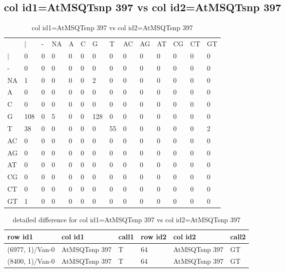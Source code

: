 \subsection{col id1=AtMSQTsnp 397 vs col id2=AtMSQTsnp 397}
\begin{center}
\begin{longtable}{|l|l|l|l|l|l|l|l|l|l|l|l|l|l|}
\caption{col id1=AtMSQTsnp 397 vs col id2=AtMSQTsnp 397} \label{table_dm904}\\
\hline
\\
\hline
&$|$&-&NA&A&C&G&T&AC&AG&AT&CG&CT&GT\\
$|$&0&0&0&0&0&0&0&0&0&0&0&0&0\\
-&0&0&0&0&0&0&0&0&0&0&0&0&0\\
NA&1&0&0&0&0&2&0&0&0&0&0&0&0\\
A&0&0&0&0&0&0&0&0&0&0&0&0&0\\
C&0&0&0&0&0&0&0&0&0&0&0&0&0\\
G&108&0&5&0&0&128&0&0&0&0&0&0&0\\
T&38&0&0&0&0&0&55&0&0&0&0&0&2\\
AC&0&0&0&0&0&0&0&0&0&0&0&0&0\\
AG&0&0&0&0&0&0&0&0&0&0&0&0&0\\
AT&0&0&0&0&0&0&0&0&0&0&0&0&0\\
CG&0&0&0&0&0&0&0&0&0&0&0&0&0\\
CT&0&0&0&0&0&0&0&0&0&0&0&0&0\\
GT&1&0&0&0&0&0&0&0&0&0&0&0&0\\
\hline
\end{longtable}
\end{center}

\begin{center}
\begin{longtable}{|l|l|l|l|l|l|}
\caption{detailed difference for col id1=AtMSQTsnp 397 vs col id2=AtMSQTsnp 397} \label{table_dm905}\\
\hline
row id1&col id1&call1&row id2&col id2&call2\\
\hline
(6977, 1)/Van-0&AtMSQTsnp 397&T&64&AtMSQTsnp 397&GT\\
(8400, 1)/Van-0&AtMSQTsnp 397&T&64&AtMSQTsnp 397&GT\\
\hline
\end{longtable}
\end{center}

